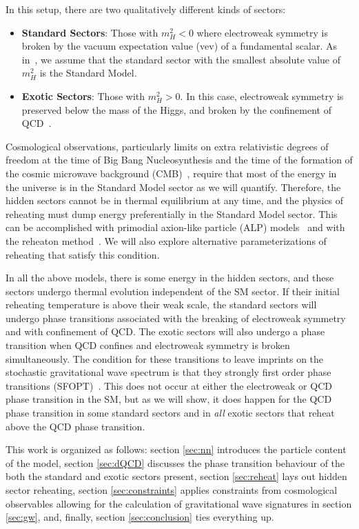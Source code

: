 \documentclass[nofootinbib,twocolumn,preprintnumbers]{revtex4-1}
\begin{document}
In this setup, there are two qualitatively different kinds of sectors:
\begin{itemize}
\item \textbf{Standard Sectors}: Those with $m_H^2 < 0$ where electroweak symmetry is broken by the vacuum expectation value (vev) of a fundamental scalar. As in~\cite{Arkani-Hamed:2016rle}, we assume that the standard sector with the smallest absolute value of $m_H^2$ is the Standard Model.
\item \textbf{Exotic Sectors}: Those with  $m_H^2 > 0$. In this case, electroweak symmetry is preserved below the mass of the Higgs, and broken by the confinement of QCD~\cite{Susskind:1978ms}.
\end{itemize}
Cosmological observations, particularly limits on extra relativistic degrees of freedom at the time of Big Bang Nucleosynthesis and the time of the formation of the cosmic microwave background (CMB)~\cite{Aghanim:2018eyx}, require that most of the energy in the universe is in the Standard Model sector as we will quantify. Therefore, the hidden sectors cannot be in thermal equilibrium at any time, and the physics of reheating must dump energy preferentially in the Standard Model sector. This can be accomplished with primodial axion-like particle (ALP) models~\cite{MARSH20161,PhysRevLett.121.201303} and with the reheaton method~\cite{Arkani-Hamed:2016rle}. We will also explore alternative parameterizations of reheating that satisfy this condition.

In all the above models, there is some energy in the hidden sectors, and these sectors undergo thermal evolution independent of the SM sector. If their initial reheating temperature is above their weak scale, the standard sectors will undergo phase transitions associated with the breaking of electroweak symmetry and with confinement of QCD. The exotic sectors will also undergo a phase transition when QCD confines and electroweak symmetry is broken simultaneously. The condition for these transitions to leave imprints on the stochastic gravitational wave spectrum is that they strongly first order phase transitions (SFOPT)~\cite{Witten:1984rs,Hogan:1984hx,Hogan:1986qda,PhysRevLett.65.3080}. This does not occur at either the electroweak or QCD phase transition in the SM, but as we will show, it does happen for the QCD phase transition in some standard sectors and in \textit{all} exotic sectors that reheat above the QCD phase transition. 

This work is organized as follows: section \ref{sec:nn} introduces the particle content of the model, section \ref{sec:dQCD} discusses the phase transition behaviour of the both the standard and exotic sectors present, section \ref{sec:reheat} lays out hidden sector reheating, section \ref{sec:constraints} applies constraints from cosmological observables allowing for the calculation of gravitational wave signatures in section \ref{sec:gw}, and, finally, section \ref{sec:conclusion} ties everything up.
\end{document}
